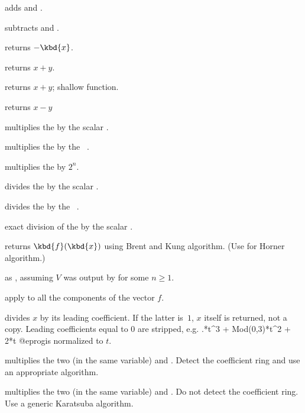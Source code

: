 
 adds  and .

 subtracts  and .

 returns $-\kbd{x}$.

 returns $x+y$.

 returns $x+y$; shallow function.


 returns $x-y$

 multiplies the  
by the scalar .

 multiplies the  
by the ~.

 multiplies the  
by $2^n$.

 divides the  
by the scalar .

 divides the  
by the ~.

 exact division of the 
 by the scalar .

 returns $\kbd{f}(\kbd{x})$ using
Brent and Kung algorithm. (Use  for Horner algorithm.)

 as ,
assuming $V$ was output by  for some $n\geq 1$.

 apply 
to all the components of the vector $f$.

 divides $x$ by its
leading coefficient. If the latter is~$1$, $x$ itself is returned, not a
copy. Leading coefficients equal to $0$ are stripped, e.g.
.*t^3 + Mod(0,3)*t^2 + 2*t
@eprog\noindent is normalized to $t$.

 multiplies the two  (in the same
variable)  and . Detect the coefficient ring and use an
appropriate algorithm.

 multiplies the two  (in the same
variable)  and . Do not detect the coefficient ring.
Use a generic Karatsuba algorithm.

